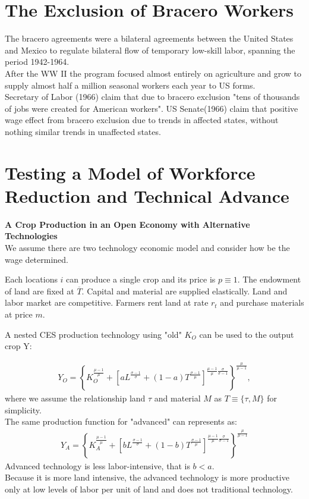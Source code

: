 \documentclass[../root]{subfiles}
\begin{document}
    \section{The Exclusion of Bracero Workers}
    The bracero agreements were a bilateral agreements between the United States and Mexico to regulate bilateral flow of temporary low-skill labor, spanning the period 1942-1964.  \\
    After the WW II the program focused almost entirely on agriculture and grow to supply almost half a million seasonal workers each year to US forms.  \\
    
    Secretary of Labor (1966) claim that due to bracero exclusion "tens of thousands of jobs were created for American workers".
    US Senate(1966) claim that positive wage effect from bracero exclusion due to trends in affected states, without nothing similar trends in unaffected states.
    
    \section{Testing a Model of Workforce Reduction and Technical Advance}
    {\bf A Crop Production in an Open Economy with Alternative Technologies} \\
    We assume there are two technology economic model and consider how be the wage  determined.
    
    Each locations $i$ can produce a single crop and its price is $p\equiv 1$.
    The endowment of land are fixed at $\overline{T}$.
    Capital and material are supplied elastically.
    Land and labor market are competitive.
    Farmers rent land at rate $r_t$ and purchase materials at price $m$.
    
    A nested CES production technology using "old" $K_O$ can be used to the output crop Y:
    
    \begin{align}
        Y_O = \left\{K_O^{\frac{\mu -1}{\mu}}+\left[a L^{\frac{\sigma -1}{\sigma}}+(1-a)T^{\frac{\sigma -1}{\mu}}\right]^{\frac{\mu-1}{\mu}\frac{\sigma}{\sigma-1}} \right\}^{\frac{\mu}{\mu-1}},
    \end{align}
    where we assume the relationship land $\tau$ and material $M$ as $T \equiv\{\tau, M\}$ for simplicity. \\
    
    The same production function for "advanced" can represents as:
    \begin{align}
        Y_A = \left\{K_A^{\frac{\mu -1}{\mu}}+\left[b L^{\frac{\sigma -1}{\sigma}}+(1-b)T^{\frac{\sigma -1}{\mu}}\right]^{\frac{\mu-1}{\mu}\frac{\sigma}{\sigma-1}} \right\}^{\frac{\mu}{\mu-1}}
    \end{align}
    Advanced technology is less labor-intensive, that is $b<a$. \\
    Because it is more land intensive, the advanced technology is more productive only at low levels of labor per unit of land and does not traditional technology.\\
    
\end{document}

